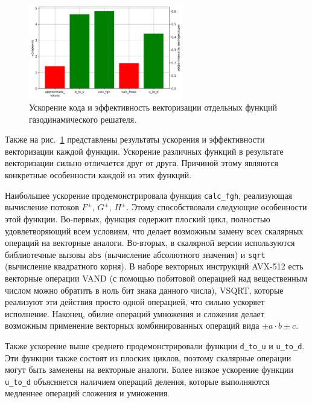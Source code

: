 \begin{figure}[ht]
\centering
\includegraphics[width=0.6\textwidth]{./fig/vec_ibm_diagr2.png}
\singlespacing
{}\caption{Ускорение кода и эффективность векторизации отдельных функций газодинамического решателя.}
\label{fig:text_4_ibm_diagr2}
\end{figure}

Также на рис.~\ref{fig:text_4_ibm_diagr2} представлены результаты ускорения и эффективности векторизации каждой функции.
Ускорение различных функций в результате векторизации сильно отличается друг от друга.
Причиной этому являются конкретные особенности каждой из этих функций.

Наибольшее ускорение продемонстрировала функция \texttt{calc\_fgh}, реализующая вычисление потоков $F^{\pm}$, $G^{\pm}$, $H^{\pm}$.
Этому способствовали следующие особенности этой функции.
Во-первых, функция содержит плоский цикл, полностью удовлетворяющий всем условиям, что делает возможным замену всех скалярных операций на векторные аналоги.
Во-вторых, в скалярной версии используются библиотечные вызовы \texttt{abs} (вычисление абсолютного значения) и \texttt{sqrt} (вычисление квадратного корня).
В наборе векторных инструкций AVX-512 есть векторные операции VAND (с помощью побитовой операцией над вещественным числом можно обратить в ноль бит знака данного числа), VSQRT, которые реализуют эти действия просто одной операцией, что сильно ускоряет исполнение.
Наконец, обилие операций умножения и сложения делает возможным применение векторных комбинированных операций вида $\pm a \cdot b \pm c$.

Также ускорение выше среднего продемонстрировали функции \texttt{d\_to\_u} и \texttt{u\_to\_d}.
Эти функции также состоят из плоских циклов, поэтому скалярные операции могут быть заменены на векторные аналоги.
Более низкое ускорение функции \texttt{u\_to\_d} объясняется наличием операций деления, которые выполняются медленнее операций сложения и умножения.

